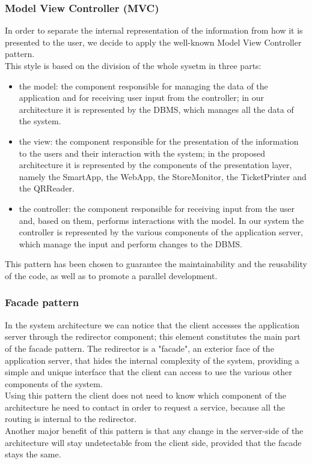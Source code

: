 \subsubsection{Model View Controller (MVC)}
In order to separate the internal representation of the information from how it is presented to the user, we decide to apply the well-known Model View Controller pattern.\\
This style is based on the division of the whole sysetm in three parts:
\begin{itemize}
	\item the model: the component responsible for managing the data of the application and for receiving user input from the controller; in our architecture it is represented by the DBMS, which manages all the data of the system.
	\item the view: the component responsible for the presentation of the information to the users and their interaction with the system; in the proposed architecture it is represented by the components of the presentation layer, namely the SmartApp, the WebApp, the StoreMonitor, the TicketPrinter and the QRReader.
	\item the controller: the component responsible for receiving input from the user and, based on them, performs interactions with the model. In our system the controller is represented by the various components of the application server, which manage the input and perform changes to the DBMS.
\end{itemize}
This pattern has been chosen to guarantee the maintainability and the reusability of the code, as well as to promote a parallel development.
\subsubsection{Facade pattern}
In the system architecture we can notice that the client accesses the application server through the redirector component; this element constitutes the main part of the facade pattern. The redirector is a "facade", an exterior face of the application server, that hides the internal complexity of the system, providing a simple and unique interface that the client can access to use the various other components of the system.\\
Using this pattern the client does not need to know which component of the architecture he need to contact in order to request a service, because all the routing is internal to the redirector.\\
Another major benefit of this pattern is that any change in the server-side of the architecture will stay undetectable from the client side, provided that the facade stays the same.
